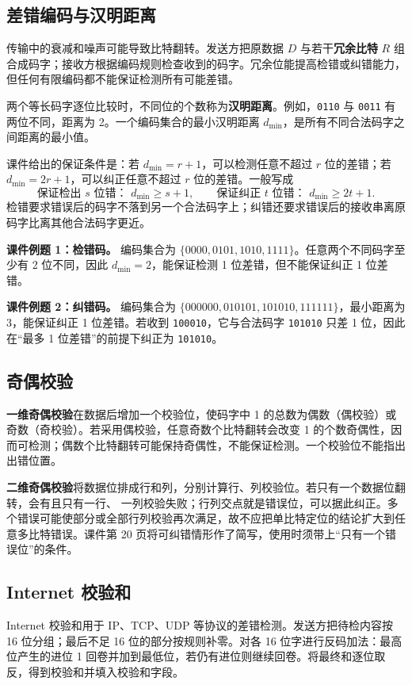 \subsection{差错编码与汉明距离}
传输中的衰减和噪声可能导致比特翻转。发送方把原数据 $D$ 与若干\textbf{冗余比特} $R$ 组合成码字；接收方根据编码规则检查收到的码字。冗余位能提高检错或纠错能力，但任何有限编码都不能保证检测所有可能差错。

两个等长码字逐位比较时，不同位的个数称为\textbf{汉明距离}。例如，\texttt{0110} 与 \texttt{0011} 有两位不同，距离为 2。一个编码集合的最小汉明距离 $d_{\min}$，是所有不同合法码字之间距离的最小值。

课件给出的保证条件是：若 $d_{\min}=r+1$，可以检测任意不超过 $r$ 位的差错；若 $d_{\min}=2r+1$，可以纠正任意不超过 $r$ 位的差错。一般写成
\[
  \text{保证检出 }s\text{ 位错： }d_{\min}\ge s+1,\qquad
  \text{保证纠正 }t\text{ 位错： }d_{\min}\ge 2t+1.
\]
检错要求错误后的码字不落到另一个合法码字上；纠错还要求错误后的接收串离原码字比离其他合法码字更近。

\textbf{课件例题 1：检错码。} 编码集合为 $\{0000,0101,1010,1111\}$。任意两个不同码字至少有 2 位不同，因此 $d_{\min}=2$，能保证检测 1 位差错，但不能保证纠正 1 位差错。

\textbf{课件例题 2：纠错码。} 编码集合为 $\{000000,010101,101010,111111\}$，最小距离为 3，能保证纠正 1 位差错。若收到 \texttt{100010}，它与合法码字 \texttt{101010} 只差 1 位，因此在“最多 1 位差错”的前提下纠正为 \texttt{101010}。


\subsection{奇偶校验}
\textbf{一维奇偶校验}在数据后增加一个校验位，使码字中 1 的总数为偶数（偶校验）或奇数（奇校验）。若采用偶校验，任意奇数个比特翻转会改变 1 的个数奇偶性，因而可检测；偶数个比特翻转可能保持奇偶性，不能保证检测。一个校验位不能指出出错位置。

\textbf{二维奇偶校验}将数据位排成行和列，分别计算行、列校验位。若只有一个数据位翻转，会有且只有一行、 一列校验失败；行列交点就是错误位，可以据此纠正。多个错误可能使部分或全部行列校验再次满足，故不应把单比特定位的结论扩大到任意多比特错误。课件第 20 页将可纠错情形作了简写，使用时须带上“只有一个错误位”的条件。


\subsection{Internet 校验和}
Internet 校验和用于 IP、TCP、UDP 等协议的差错检测。发送方把待检内容按 16 位分组；最后不足 16 位的部分按规则补零。对各 16 位字进行反码加法：最高位产生的进位 1 回卷并加到最低位，若仍有进位则继续回卷。将最终和逐位取反，得到校验和并填入校验和字段。

